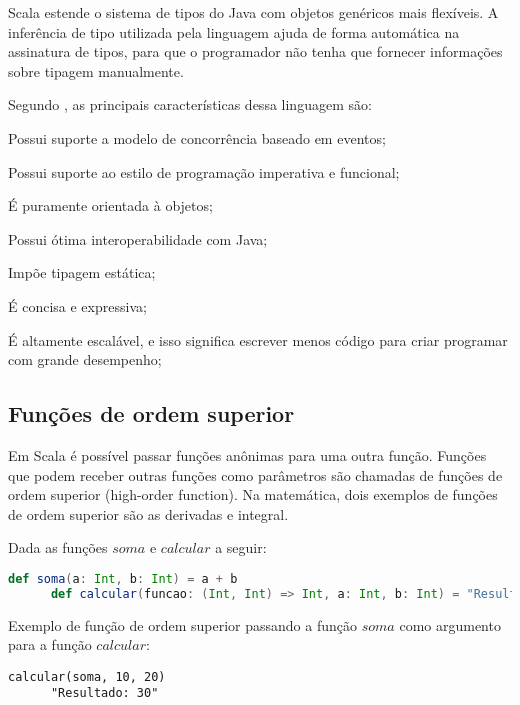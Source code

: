   Scala estende o sistema de tipos do Java com objetos genéricos mais flexíveis. A inferência de tipo utilizada pela linguagem ajuda de forma automática na assinatura de tipos, para que o programador não tenha que fornecer informações sobre tipagem manualmente.

  Segundo , as principais características dessa linguagem são:

  \begin{compactitem}
    \item Possui suporte a modelo de concorrência baseado em eventos;
    \item Possui suporte ao estilo de programação imperativa e funcional;
    \item É puramente orientada à objetos;
    \item Possui ótima interoperabilidade com Java;
    \item Impõe tipagem estática;
    \item É concisa e expressiva;
    \item É altamente escalável, e isso significa escrever menos código para criar programar com grande desempenho;
  \end{compactitem}

    \subsection{Funções de ordem superior}

    Em Scala é possível passar funções anônimas para uma outra função. Funções que podem receber outras funções como parâmetros são chamadas de funções de ordem superior (high-order function). Na matemática, dois exemplos de funções de ordem superior são as derivadas e integral.

    Dada as funções $soma$ e $calcular$ a seguir:

    \begin{lstlisting}[language=Scala, mathescape=false]
      def soma(a: Int, b: Int) = a + b
      def calcular(funcao: (Int, Int) => Int, a: Int, b: Int) = "Resultado: " + funcao(a, b)
    \end{lstlisting}

    Exemplo de função de ordem superior passando a função $soma$ como argumento para a função $calcular$:

    \begin{lstlisting}[mathescape=false]
      calcular(soma, 10, 20)
      "Resultado: 30"
    \end{lstlisting}

